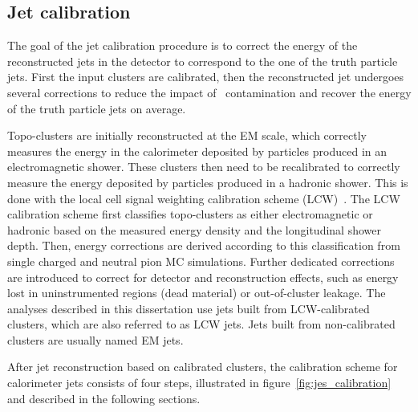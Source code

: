\subsection{Jet calibration}
    \label{subsec:JetCalibration}

    The goal of the jet calibration procedure is to correct the energy of the reconstructed jets in the detector to correspond to the one of the truth particle jets. First the input clusters are calibrated, then the reconstructed jet undergoes several corrections to reduce the impact of \pileup\ contamination and recover the energy of the truth particle jets on average.

Topo-clusters are initially reconstructed at the EM scale, which correctly measures the energy in the calorimeter deposited by particles produced in an electromagnetic shower.
These clusters then need to be recalibrated to correctly measure the energy deposited by particles produced in a hadronic shower.
This is done with the local cell signal weighting calibration scheme (LCW)~\cite{Aad:2011he}.
The LCW calibration scheme first classifies topo-clusters as either electromagnetic or hadronic based on the measured energy density and the longitudinal shower depth.
Then, energy corrections are derived according to this classification from single charged and neutral pion MC simulations.
Further dedicated corrections are introduced to correct for detector and reconstruction effects, such as energy lost in uninstrumented regions (dead material) or out-of-cluster leakage.
The analyses described in this dissertation use jets built from LCW-calibrated clusters, which are also referred to as LCW jets. Jets built from non-calibrated clusters are usually named EM jets.

After jet reconstruction based on calibrated clusters, the calibration scheme for calorimeter jets consists of four steps, illustrated in figure~\ref{fig:jes_calibration} and described in the following sections.

